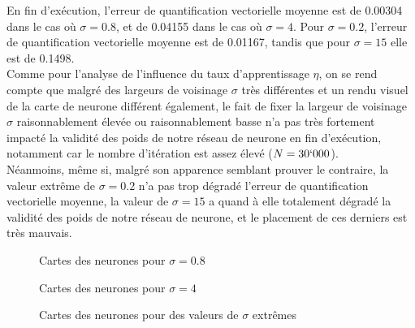\documentclass{article}
\begin{document}
En fin d'exécution, l'erreur de quantification vectorielle moyenne est de 0.00304 dans le cas où $\sigma = 0.8$, et de 0.04155 dans le cas où $\sigma = 4$. Pour $\sigma = 0.2$, l'erreur de quantification vectorielle moyenne est de 0.01167, tandis que pour $\sigma = 15$ elle est de 0.1498.\\
Comme pour l'analyse de l'influence du taux d'apprentissage $\eta$, on se rend compte que malgré des largeurs de voisinage $\sigma$ très différentes et un rendu visuel de la carte de neurone différent également, le fait de fixer la largeur de voisinage $\sigma$ raisonnablement élevée ou raisonnablement basse n'a pas très fortement impacté la validité des poids de notre réseau de neurone en fin d'exécution, notamment car le nombre d'itération est assez élevé ($N = 30`000$).\\
Néanmoins, même si, malgré son apparence semblant prouver le contraire, la valeur extrême de $\sigma = 0.2$ n'a pas trop dégradé l'erreur de quantification vectorielle moyenne, la valeur de $\sigma = 15$ a quand à elle totalement dégradé la validité des poids de notre réseau de neurone, et le placement de ces derniers est très mauvais.\\


\begin{figure}[H]
    \centering
    \hypertarget{figure-sigma-0.8}{}
    \caption{Cartes des neurones pour $\sigma = 0.8$}
    \label{figure-sigma-0.8}
\end{figure}


\begin{figure}[H]
    \centering
    \hypertarget{figure-sigma-4}{}
    \caption{Cartes des neurones pour $\sigma = 4$}
    \label{figure-sigma-4}
\end{figure}


\begin{figure}[H]
    \centering
    \hypertarget{figure-sigma-extremes}{}
    \caption{Cartes des neurones pour des valeurs de $\sigma$ extrêmes}
    \label{figure-sigma-extremes}
\end{figure}
\end{document}
